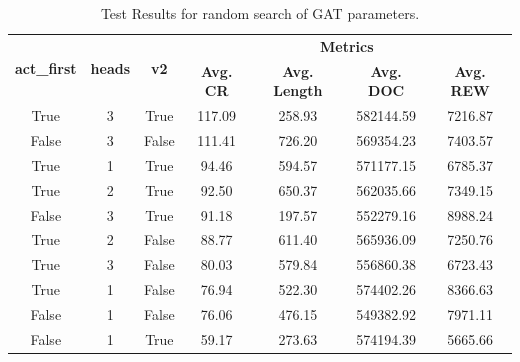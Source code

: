 \begin{table}[H]
	\centering
	\caption{Test Results for random search of \ac{GAT} parameters.}
	\begin{tabular}{ccccccc}
		\toprule
		\multirow{2}{*}{\textbf{act\_first}} & \multirow{2}{*}{\textbf{heads}} & \multirow{2}{*}{\textbf{v2}} & \multicolumn{4}{c}{\textbf{Metrics}} \\ 
		\cmidrule(lr){4-7}
		&  &  & \textbf{Avg. CR} & \textbf{Avg. Length} & \textbf{Avg. DOC} & \textbf{Avg. REW} \\ 
		\midrule
		True  & 3 & True  & 117.09 & 258.93 & 582144.59 & 7216.87 \\ 
		False & 3 & False & 111.41 & 726.20 & 569354.23 & 7403.57 \\ 
		True  & 1 & True  & 94.46  & 594.57 & 571177.15 & 6785.37 \\ 
		True  & 2 & True  & 92.50  & 650.37 & 562035.66 & 7349.15 \\ 
		False & 3 & True  & 91.18  & 197.57 & 552279.16 & 8988.24 \\ 
		True  & 2 & False & 88.77  & 611.40 & 565936.09 & 7250.76 \\ 
		True  & 3 & False & 80.03  & 579.84 & 556860.38 & 6723.43 \\ 
		True  & 1 & False & 76.94  & 522.30 & 574402.26 & 8366.63 \\ 
		False & 1 & False & 76.06  & 476.15 & 549382.92 & 7971.11 \\ 
		False & 1 & True  & 59.17  & 273.63 & 574194.39 & 5665.66 \\ 
		\bottomrule
	\end{tabular}
	\label{tab:tune-gat2}
\end{table}

